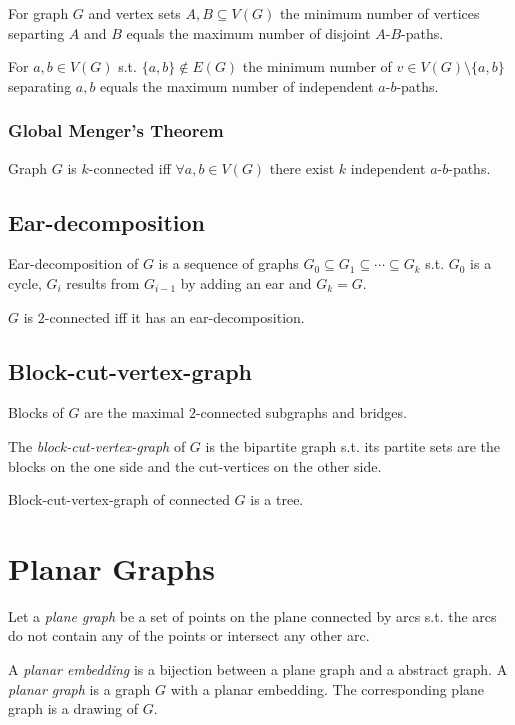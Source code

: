 For graph $G$ and vertex sets $A,B \subseteq V(G)$ the minimum number of vertices separting $A$ and $B$ equals the maximum number of disjoint $A$-$B$-paths.

\spacing

For $a, b \in V(G)$ s.t. $\{a,b\} \notin E(G)$ the minimum number of $v \in V(G)\setminus\{a,b\}$ separating $a, b$ equals the maximum number of independent $a$-$b$-paths.

\subsubsection*{Global Menger's Theorem}

Graph $G$ is $k$-connected iff $\forall a,b \in V(G)$ there exist $k$ independent $a$-$b$-paths.

\subsection*{Ear-decomposition}

Ear-decomposition of $G$ is a sequence of graphs $G_0 \subseteq G_1 \subseteq \cdots \subseteq G_k$ s.t. $G_0$ is a cycle, $G_i$ results from $G_{i-1}$ by adding an ear and $G_k = G$.

\spacing

$G$ is $2$-connected iff it has an ear-decomposition.

\subsection*{Block-cut-vertex-graph}

Blocks of $G$ are the maximal $2$-connected subgraphs and bridges.

The \emph{block-cut-vertex-graph} of $G$ is the bipartite graph s.t. its partite sets are the blocks on the one side and the cut-vertices on the other side.

\spacing

Block-cut-vertex-graph of connected $G$ is a tree.

\section*{Planar Graphs}

Let a \emph{plane graph} be a set of points on the plane connected by arcs s.t. the arcs do not contain any of the points or intersect any other arc.

A \emph{planar embedding} is a bijection between a plane graph and a abstract graph.
A \emph{planar graph} is a graph $G$ with a planar embedding. The corresponding plane graph is a drawing of $G$.

